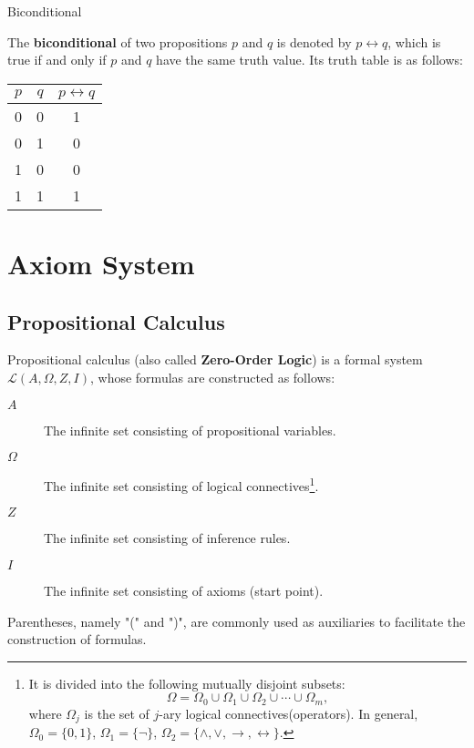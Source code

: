 \documentclass[11pt]{elegantbook}
\begin{document}
\begin{leftbarTitle}{Biconditional}\end{leftbarTitle}
The \textbf{biconditional} of two propositions \(p\) and \(q\) is denoted by \(p \leftrightarrow q\),
which is true if and only if \(p\) and \(q\) have the same truth value.
Its truth table is as follows:
\begin{center}
\begin{tabular}{ccc}
\toprule
$p$ & $q$ & $p \leftrightarrow q$ \\ %
\midrule
0 & 0 & 1 \\ %
0 & 1 & 0 \\ %
1 & 0 & 0 \\ %
1 & 1 & 1 \\ %
\bottomrule
\end{tabular}
\end{center}

\section{Axiom System}
\subsection{Propositional Calculus}
Propositional calculus (also called \textbf{Zero-Order Logic}) is a formal system \(\mathcal{L}\left( A, \Omega, Z, I \right) \),
whose formulas are constructed as follows:
\begin{description}
    \item[\({A}\)]  The infinite set consisting of propositional variables.
    \item[\({\Omega}\)]  The infinite set consisting of logical connectives\footnote{
        It is divided into the following mutually disjoint subsets:
        \[
        \Omega = \Omega_{0} \cup \Omega_{1} \cup \Omega_{2} \cup \cdots \cup \Omega_{m},
        \]
        where \(\Omega_{j}\) is the set of \(j\)-ary logical connectives(operators).
        In general, \(\Omega_{0}=\{ 0,1 \}\), \(\Omega_{1}=\{ \neg \}\), 
        \(\Omega_{2}=\{ \land, \lor, \to, \leftrightarrow \}\).
    }.
    \item[\({Z}\)]  The infinite set consisting of inference rules.
    \item[\({I}\)]  The infinite set consisting of axioms (start point).
\end{description}
Parentheses, namely "(" and ")", are commonly used as auxiliaries to facilitate the construction of formulas.
\end{document}
